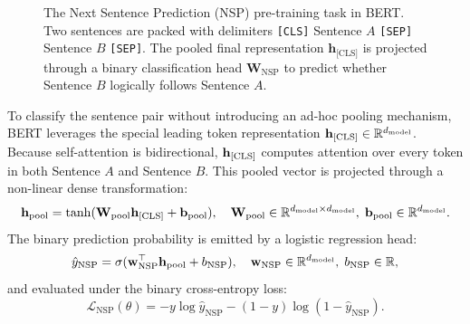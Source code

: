 \documentclass[../../main.tex]{subfiles}
\begin{document}
\begin{figure}[htbp]
{%
}
\caption{The Next Sentence Prediction (NSP) pre-training task in BERT. Two sentences are packed with delimiters \texttt{[CLS]} Sentence $A$ \texttt{[SEP]} Sentence $B$ \texttt{[SEP]}. The pooled final representation $\mathbf{h}_{\text{[CLS]}}$ is projected through a binary classification head $\mathbf{W}_{\text{NSP}}$ to predict whether Sentence $B$ logically follows Sentence $A$.}
\label{fig:bert_nsp}
\end{figure}

To classify the sentence pair without introducing an ad-hoc pooling mechanism, BERT leverages the special leading token representation $\mathbf{h}_{[\text{CLS}]} \in \mathbb{R}^{d_{\text{model}}}$. Because self-attention is bidirectional, $\mathbf{h}_{[\text{CLS}]}$ computes attention over every token in both Sentence $A$ and Sentence $B$. This pooled vector is projected through a non-linear dense transformation:
\begin{equation}
\label{eq:bert_pooled_cls_representation}
\mathbf{h}_{\text{pool}} = \tanh(\mathbf{W}_{\text{pool}} \mathbf{h}_{[\text{CLS}]} + \mathbf{b}_{\text{pool}}), \quad \mathbf{W}_{\text{pool}} \in \mathbb{R}^{d_{\text{model}} \times d_{\text{model}}}, \; \mathbf{b}_{\text{pool}} \in \mathbb{R}^{d_{\text{model}}}.
\end{equation}
The binary prediction probability is emitted by a logistic regression head:
\begin{equation}
\label{eq:bert_nsp_probability}
\hat{y}_{\text{NSP}} = \sigma(\mathbf{w}_{\text{NSP}}^\top \mathbf{h}_{\text{pool}} + b_{\text{NSP}}), \quad \mathbf{w}_{\text{NSP}} \in \mathbb{R}^{d_{\text{model}}}, \; b_{\text{NSP}} \in \mathbb{R},
\end{equation}
and evaluated under the binary cross-entropy loss:
\begin{equation}
\label{eq:bert_nsp_binary_cross_entropy}
\mathcal{L}_{\text{NSP}}(\theta) = - y \log \hat{y}_{\text{NSP}} - (1 - y) \log (1 - \hat{y}_{\text{NSP}}).
\end{equation}
\end{document}
